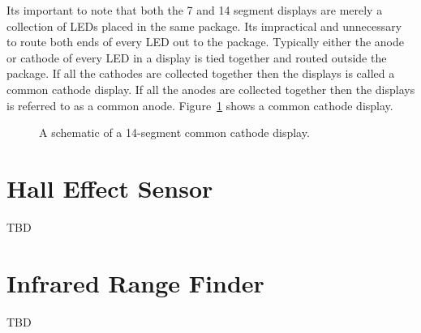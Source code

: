                 Its important to note that both the 7 and 14 segment displays are
                merely a collection of LEDs placed in the same package.  Its impractical
                and unnecessary to route both ends of every LED out to the package.
                Typically either the anode or cathode of every LED in a display is
                tied together
                and routed outside the package.  If all the cathodes are collected
                together then the displays is called a common cathode display.  If
                all the anodes are collected together then the displays is referred
                to as a common anode.  Figure~\ref{fig:commonPeripheralComponentscommon} shows a common
                cathode display.

                        \begin{figure}[ht]
                            \caption{A schematic of a 14-segment common cathode display.}
                            \label{fig:commonPeripheralComponentscommon}
                        \end{figure}

                        \section{Hall Effect Sensor}
                        TBD

                        \section{Infrared Range Finder}
                        TBD

